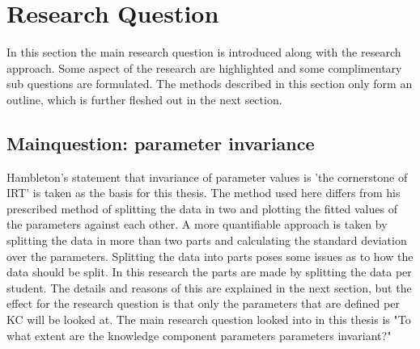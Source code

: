 \documentclass{scrartcl}
\begin{document}

\section{Research Question}
\label{sec:RQ}
In this section the main research question is introduced along with the research approach. Some aspect of the research are highlighted and some complimentary sub questions are formulated. The methods described in this section only form an outline, which is further fleshed out in the next section.

\subsection{Mainquestion: parameter invariance}
Hambleton's statement that invariance of parameter values is 'the cornerstone of IRT' is taken as the basis for this thesis. The method used here differs from his prescribed method of splitting the data in two and plotting the fitted values of the parameters against each other. A more quantifiable approach is taken by splitting the data in more than two parts and calculating the standard deviation over the parameters. Splitting the data into parts poses some issues as to how the data should be split. In this research the parts are made by splitting the data per student. The details and reasons of this are explained in the next section, but the effect for the research question is that only the parameters that are defined per KC will be looked at. The main research question looked into in this thesis is "To what extent are the knowledge component parameters parameters invariant?"
\end{document}
